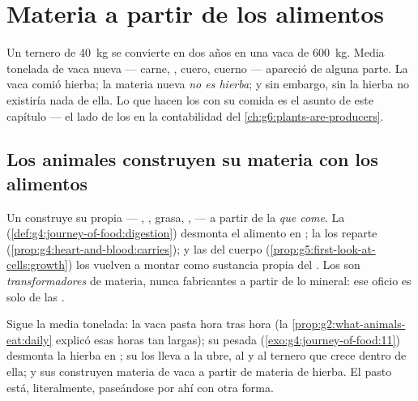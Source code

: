 \chapter{Materia a partir de los alimentos}\label{ch:g6:matter-from-food}

Un ternero de \qty{40}{kg} se convierte en dos años en una vaca de
\qty{600}{kg}. Media tonelada de vaca nueva --- carne, , cuero,
cuerno --- apareció de alguna parte. La vaca comió hierba; la materia
nueva \emph{no es hierba}; y sin embargo, sin la hierba no existiría
nada de ella. Lo que hacen los  con su comida es el asunto de
este capítulo --- el lado de los  en la contabilidad del
\cref{ch:g6:plants-are-producers}.

\section{Los animales construyen su materia con los alimentos}

\begin{proposition}\label{prop:g6:matter-from-food:transform}
Un  construye su propia  --- , ,
grasa, ,  --- a partir de la \emph{ que
come}. La  (\cref{def:g4:journey-of-food:digestion}) desmonta
el alimento en ; la  los reparte
(\cref{prop:g4:heart-and-blood:carries}); y las  del cuerpo
(\cref{prop:g5:first-look-at-cells:growth}) los vuelven a montar como
sustancia propia del . Los  son \emph{transformadores} de
materia, nunca fabricantes a partir de lo mineral: ese oficio es solo de
las .
\end{proposition}
\admitted

\begin{example}\label{ex:g6:matter-from-food:cow}
Sigue la media tonelada: la vaca pasta hora tras hora (la
\cref{prop:g2:what-animals-eat:daily} explicó esas horas tan largas);
su pesada  (\cref{exo:g4:journey-of-food:11}) desmonta la
hierba en ; su  los lleva a la ubre, al  y al
ternero que crece dentro de ella; y sus  construyen materia de
vaca a partir de materia de hierba. El pasto está, literalmente,
paseándose por ahí con otra forma.
\end{example}

